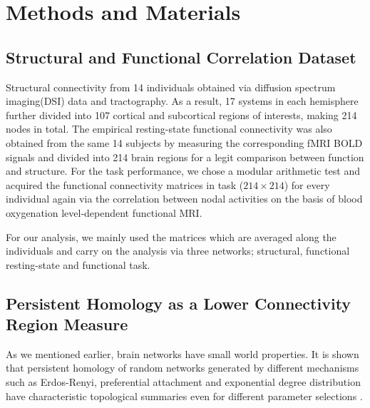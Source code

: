 \documentclass[9pt,twocolumn,twoside,lineno]{pnas-new}
\begin{document}
\section*{Methods and Materials}

\subsection{Structural and Functional Correlation Dataset} Structural connectivity from 14 individuals obtained via diffusion spectrum imaging(DSI) data and tractography. As a result, 17 systems in each hemisphere further divided into 107 cortical and subcortical regions of interests, making 214 nodes in total.
The empirical resting-state functional connectivity was also obtained from the same 14 subjects by measuring the corresponding fMRI BOLD signals and divided into 214 brain regions for a legit comparison between function and structure. For the task performance, we chose a modular arithmetic test and acquired the functional connectivity matrices in task ($214\times 214$) for every individual again via the correlation between nodal activities on the basis of blood oxygenation level-dependent functional MRI. 

For our analysis, we mainly used the matrices which are averaged along the individuals and carry on the analysis via three networks; structural, functional resting-state and functional task.



\subsection{Persistent Homology as a Lower Connectivity Region Measure}
As we mentioned earlier, brain networks have small world properties. It is shown that persistent homology of random networks generated by different mechanisms such as Erdos-Renyi, preferential attachment and exponential degree distribution have characteristic topological summaries even for different parameter selections \cite{pershomcompnetw}.
\end{document}
